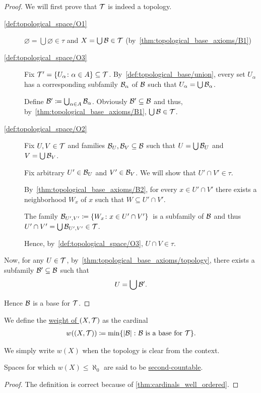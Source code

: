 \begin{proof}
  We will first prove that $\mathcal T$ is indeed a topology.

  \begin{description}
    \item[\ref{def:topological_space/O1}] $\varnothing = \bigcup \varnothing \in \tau$ and $X = \bigcup \mathcal B \in \mathcal T$ (by~\ref{thm:topological_base_axioms/B1})

    \item[\ref{def:topological_space/O3}] Fix $\mathcal T' = \{ U_\alpha \colon \alpha \in A \} \subseteq \mathcal T$. By~\cref{def:topological_base/union}, every set $U_\alpha$ has a corresponding subfamily $\mathcal B_\alpha$ of $\mathcal B$ such that $U_\alpha = \bigcup \mathcal B_\alpha$.

    Define $\mathcal B' \coloneqq \bigcup_{\alpha \in A} \mathcal B_\alpha$. Obviously $\mathcal B' \subseteq \mathcal B$ and thus, by~\ref{thm:topological_base_axioms/B1}, $\bigcup \mathcal B \in \mathcal T$.

    \item[\ref{def:topological_space/O2}] Fix $U, V \in \mathcal T$ and families $\mathcal B_U, \mathcal B_V \subseteq \mathcal B$ such that $U = \bigcup \mathcal B_U$ and $V = \bigcup \mathcal B_V$.

    Fix arbitrary $U' \in \mathcal B_U$ and $V' \in \mathcal B_V$. We will show that $U' \cap V' \in \tau$.

    By~\ref{thm:topological_base_axioms/B2}, for every $x \in U' \cap V'$ there exists a neighborhood $W_x$ of $x$ such that $W \subseteq U' \cap V'$.

    The family $\mathcal B_{U',V'} \coloneqq \{ W_x \colon x \in U' \cap V' \}$~\AOC is a subfamily of $\mathcal B$ and thus $U' \cap V' = \bigcup \mathcal B_{U',V'} \in \mathcal T$.

    Hence, by~\ref{def:topological_space/O3}, $U \cap V \in \tau$.
  \end{description}

  Now, for any $U \in \mathcal T$, by~\cref{thm:topological_base_axioms/topology}, there exists a subfamily $\mathcal B' \subseteq \mathcal B$ such that
  \begin{align*}
    U = \bigcup \mathcal B'.
  \end{align*}

  Hence $\mathcal B$ is a base for $\mathcal T$.
\end{proof}

\begin{definition}\label{def:topological_space_weight}
  We define the \ul{weight of $(X, \mathcal T)$} as the cardinal
  \begin{align*}
    w((X, \mathcal T)) \coloneqq \min \{ \left\vert \mathcal B \right\vert \colon \mathcal B \text{ is a base for } \mathcal T \}.
  \end{align*}

  We simply write $w(X)$ when the topology is clear from the context.

  Spaces for which $w(X) \leq \aleph_0$ are said to be \ul{second-countable}.
\end{definition}
\begin{proof}
  The definition is correct because of \cref{thm:cardinals_well_ordered}.
\end{proof}

